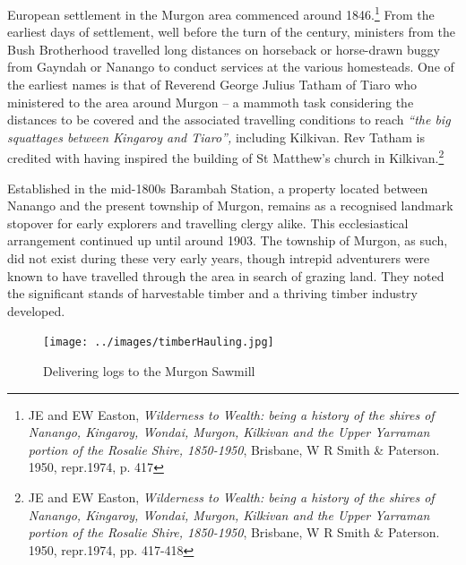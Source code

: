European settlement in the Murgon area commenced around 1846.\footnote{JE and EW Easton, \emph{Wilderness to Wealth: being a history of the shires of Nanango, Kingaroy, Wondai, Murgon, Kilkivan and the Upper Yarraman portion of the Rosalie Shire, 1850-1950}, Brisbane, W R Smith \& Paterson. 1950, repr.1974, p. 417} From the earliest days of settlement, well before the turn of the century, ministers from the Bush Brotherhood travelled long distances on horseback or horse-drawn buggy from Gayndah or Nanango to conduct services at the various homesteads. One of the earliest names is that of Reverend George Julius Tatham of Tiaro who ministered to the area around Murgon -- a mammoth task considering the distances to be covered and the associated travelling conditions to reach \emph{``the big squattages between Kingaroy and Tiaro'',} including Kilkivan. Rev Tatham is credited with having inspired the building of St Matthew's church in Kilkivan.\footnote{JE and EW Easton, \emph{Wilderness to Wealth: being a history of the shires of Nanango, Kingaroy, Wondai, Murgon, Kilkivan and the Upper Yarraman portion of the Rosalie Shire, 1850-1950}, Brisbane, W R Smith \& Paterson. 1950, repr.1974, pp. 417-418}


Established in the mid-1800s Barambah Station, a property located between Nanango and the present township of Murgon, remains as a recognised landmark stopover for early explorers and travelling clergy alike. This ecclesiastical arrangement continued up until around 1903. The township of Murgon, as such, did not exist during these very early years, though intrepid adventurers were known to have travelled through the area in search of grazing land. They noted the significant stands of harvestable timber and a thriving timber industry developed.









\begin{figure}
\begin{center}
\texttt{[image: ../images/timberHauling.jpg]}
\caption{Delivering logs to the Murgon Sawmill}
\end{center}
\end{figure}




